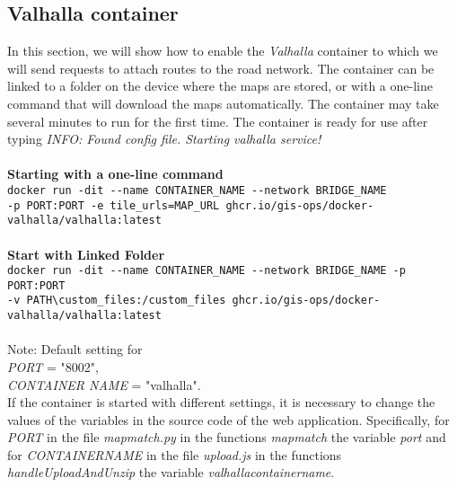 \subsection{Valhalla container}
In this section, we will show how to enable the \textit{Valhalla} container to which we will send requests to attach routes to the road network. The container can be linked to a folder on the device where the maps are stored, or with a one-line command that will download the maps automatically. The container may take several minutes to run for the first time. The container is ready for use after typing \textit{INFO: Found config file. Starting valhalla service!} \\\\
\textbf{Starting with a one-line command}\\
\indent \verb|docker run -dit --name CONTAINER_NAME --network BRIDGE_NAME|\\
\indent \verb|-p PORT:PORT -e tile_urls=MAP_URL ghcr.io/gis-ops/docker-valhalla/valhalla:latest|\\\\
\textbf{Start with Linked Folder}\\
\indent \verb|docker run -dit --name CONTAINER_NAME --network BRIDGE_NAME -p PORT:PORT |\\
\indent \verb|-v PATH\custom_files:/custom_files ghcr.io/gis-ops/docker-valhalla/valhalla:latest|\\\\

\noindent Note: Default setting for \\
\textit{PORT} = "8002", \\
\textit{CONTAINER \textunderscore NAME} = "valhalla". \\
If the container is started with different settings, it is necessary to change the values of the variables in the source code of the web application. Specifically, for \textit{PORT} in the file \textit{map\textunderscore match.py} in the functions \textit{map\textunderscore match} the variable \textit{port} and for \textit{CONTAINER\textunderscore NAME} in the file \textit{ upload.js} in the functions \textit{handleUploadAndUnzip} the variable \textit{valhalla\textunderscore container\textunderscore name}.